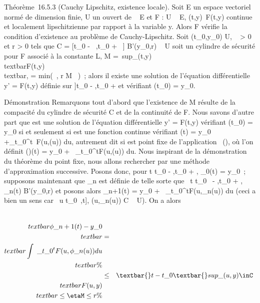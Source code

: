 \documentclass[]{article}
\begin{document}
Théorème~16.5.3 (Cauchy Lipschitz, existence locale). Soit E un espace
vectoriel normé de dimension finie, U un ouvert de ~ \times E et F : U \rightarrow~ E,
(t,y)\mapsto~F(t,y) continue et localement
lipschitzienne par rapport à la variable y. Alors F vérifie la condition
d'existence au problème de Cauchy-Lipschitz. Soit
(t\_0,y\_0) \in U, \alpha~ \textgreater{} 0 et r \textgreater{}
0 tels que C = {[}t\_0 - \alpha~,t\_0 + \alpha~{]} \times
B'(y\_0,r) \subset~ U soit un cylindre de sécurité pour F associé à la
constante L, M =\
sup\_(t,y)\inC\\textbar{}F(t,y)\\textbar{},
\eta = min(\alpha~, r \over M~ )~;
alors il existe une solution \phi de l'équation différentielle y' = F(t,y)
définie sur {]}t\_0 - \eta,t\_0 + \eta{[} et vérifiant
\phi(t\_0) = y\_0.

Démonstration Remarquons tout d'abord que l'existence de M résulte de la
compacité du cylindre de sécurité C et de la continuité de F. Nous
savons d'autre part que \phi est une solution de l'équation différentielle
y' = F(t,y) vérifiant \phi(t\_0) = y\_0 si et seulement si
\phi est une fonction continue vérifiant \phi(t) = y\_0
+\int  \_t\_0^t~F(u,\phi(u))
du, autrement dit si \phi est point fixe de l'application
\psi\mapsto~\Gamma(\psi), où l'on définit \Gamma(\psi)(t) =
y\_0 +\int ~
\_t\_0^tF(u,\psi(u)) du. Nous inspirant de la
démonstration du théorème du point fixe, nous allons rechercher \phi par
une méthode d'approximation successive. Posons donc, pour t
\in{]}t\_0 - \eta,t\_0 + \eta{[}, \phi\_0(t) =
y\_0~; supposons maintenant que \phi\_n est définie de
telle sorte que \forall~t \in{]}t\_0~ -
\eta,t\_0 + \eta{[}, \phi\_n(t) \in B'(y\_0,r) et posons
alors \phi\_n+1(t) = y\_0 +\int ~
\_t\_0^tF(u,\phi\_n(u)) du (ceci a bien un
sens car \forall~u \in {[}t\_0~,t{]},
(u,\phi\_n(u)) \in C \subset~ U). On a alors

\begin{align*}
\\textbar{}\phi\_n+1(t) -
y\_0\\textbar{}& =&
\\textbar{}\int ~
\_t\_0^tF(u,\phi\_ n(u))
du\\textbar{} \%& \\ &
\leq& \textbar{}t -
t\_0\textbar{}sup\_(u,y)\inC~\\textbar{}F(u,y)\\textbar{}
\leq \etaM \leq r\%& \\
\end{align*}
\end{document}
